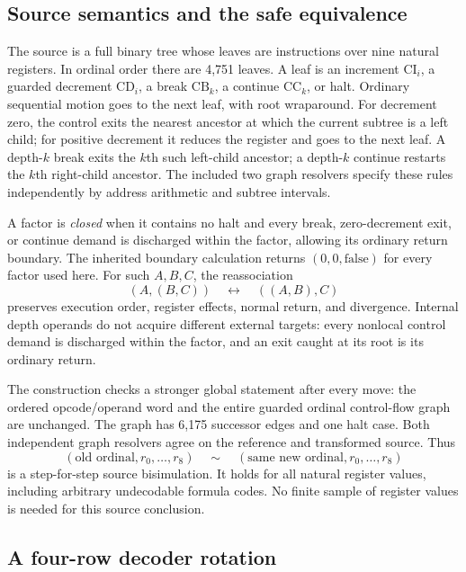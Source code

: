 \documentclass[11pt]{article}
\begin{document}
\subsection{Source semantics and the safe equivalence}

The source is a full binary tree whose leaves are instructions over nine
natural registers. In ordinal order there are 4,751 leaves. A leaf is
an increment $\mathrm{CI}_i$, a guarded decrement $\mathrm{CD}_i$, a
break $\mathrm{CB}_k$, a continue $\mathrm{CC}_k$, or halt.
Ordinary sequential motion goes to the next leaf, with root wraparound.
For decrement zero, the control exits the nearest ancestor at which
the current subtree is a left child; for positive decrement it reduces
the register and goes to the next leaf. A depth-$k$ break exits the
$k$th such left-child ancestor; a depth-$k$ continue restarts the
$k$th right-child ancestor. The included two graph resolvers specify
these rules independently by address arithmetic and subtree intervals.

A factor is \emph{closed} when it contains no halt and every break,
zero-decrement exit, or continue demand is discharged within the factor,
allowing its ordinary return boundary. The inherited
boundary calculation returns $(0,0,\mathrm{false})$ for every factor
used here. For such $A,B,C$, the reassociation
\[
               (A,(B,C))\quad\longleftrightarrow\quad((A,B),C)
\]
preserves execution order, register effects, normal return, and
divergence. Internal depth operands do not acquire different external
targets: every nonlocal control demand is discharged within the factor,
and an exit caught at its root is its ordinary return.

The construction checks a stronger global statement after every move:
the ordered opcode/operand word and the entire guarded ordinal
control-flow graph are unchanged. The graph has 6,175 successor edges
and one halt case. Both independent graph resolvers agree on the
reference and transformed source. Thus
\[
 (\text{old ordinal},r_0,\ldots,r_8)
 \quad\mathrel{\sim}\quad
 (\text{same new ordinal},r_0,\ldots,r_8)
\]
is a step-for-step source bisimulation. It holds for all natural
register values, including arbitrary undecodable formula codes. No
finite sample of register values is needed for this source conclusion.

\subsection{A four-row decoder rotation}
\end{document}
